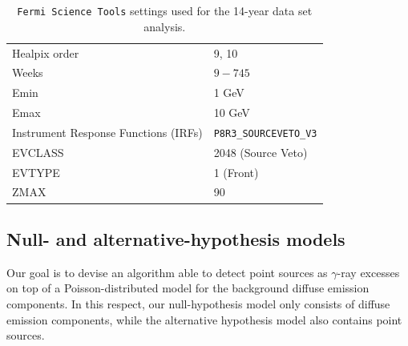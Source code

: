 \begin{table}[t]
\centering
\begin{tabular}{ | l| l|  }
\hline
Healpix order & 9, 10  \\ 
Weeks & $9-745$  \\ 
Emin & 1 GeV \\
Emax & 10 GeV \\
Instrument Response Functions (IRFs) & \verb|P8R3_SOURCEVETO_V3| \\
EVCLASS & 2048 (Source Veto)  \\ 
EVTYPE & 1 (Front)  \\
ZMAX & 90 \\
\hline
\end{tabular}
\caption{\texttt{Fermi Science Tools} settings used for the 14-year data set analysis. }
\label{tab:catalog:settings}
\end{table}

\subsection{Null- and alternative-hypothesis models}
\label{sec:catalog:models}

Our goal is to devise an algorithm able to detect point sources as $\gamma$-ray excesses
on top of a Poisson-distributed model for the background diffuse emission components. 
In this respect, our null-hypothesis model only consists of diffuse emission components, while
the alternative hypothesis model also contains point sources. 

